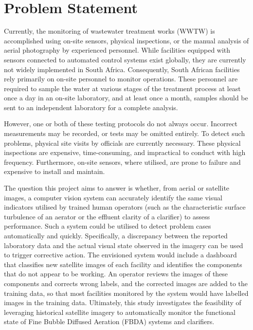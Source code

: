 \label{chap:introduction}

\section{Problem Statement}
Currently, the monitoring of wastewater treatment works (WWTW) is accomplished using on-site sensors, physical inspections, or the manual analysis of aerial photography by experienced personnel. While facilities equipped with sensors connected to automated control systems exist globally, they are currently not widely implemented in South Africa. Consequently, South African facilities rely primarily on on-site personnel to monitor operations. These personnel are required to sample the water at various stages of the treatment process at least once a day in an on-site laboratory, and at least once a month, samples should be sent to an independent laboratory for a complete analysis.

However, one or both of these testing protocols do not always occur. Incorrect measurements may be recorded, or tests may be omitted entirely. To detect such problems, physical site visits by officials are currently necessary. These physical inspections are expensive, time-consuming, and impractical to conduct with high frequency. Furthermore, on-site sensors, where utilised, are prone to failure and expensive to install and maintain.

The question this project aims to answer is whether, from aerial or satellite images, a computer vision system can accurately identify the same visual indicators utilised by trained human operators (such as the characteristic surface turbulence of an aerator or the effluent clarity of a clarifier) to assess performance. Such a system could be utilised to detect problem cases automatically and quickly. Specifically, a discrepancy between the reported laboratory data and the actual visual state observed in the imagery can be used to trigger corrective action. The envisioned system would include a dashboard that classifies new satellite images of each facility and identifies the components that do not appear to be working. An operator reviews the images of these components and corrects wrong labels, and the corrected images are added to the training data, so that most facilities monitored by the system would have labelled images in the training data. Ultimately, this study investigates the feasibility of leveraging historical satellite imagery to automatically monitor the functional state of Fine Bubble Diffused Aeration (FBDA) systems and clarifiers.


